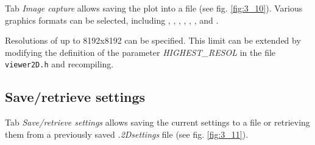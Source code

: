 \documentclass[10pt]{article}
\begin{document}
Tab {\it Image capture} allows saving the plot into a file  
(see fig. \ref{fig:3_10}). Various graphics formats can be selected, including  
\png{ }, \jpg, \bmp, \ppm, \tiff, \xbm, and \xpm.  

Resolutions of up to 8192x8192 can be specified.  
This limit can be extended by modifying the definition of the parameter  
{\it HIGHEST\_RESOL} in the file \texttt{viewer2D.h} and recompiling.   

\subsection{Save/retrieve settings\label{sec:3.9}}

Tab {\it Save/retrieve settings}  
allows saving the current settings to a file or retrieving them  
from a previously saved {\it .2Dsettings} file (see fig. \ref{fig:3_11}).  
\end{document}
